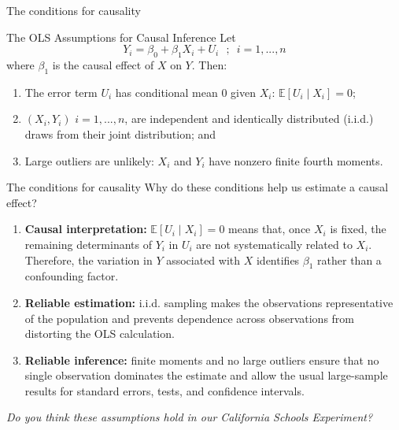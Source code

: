 \documentclass[notes,10pt, aspectratio=169]{beamer}
\begin{document}
\begin{frame}{The conditions for causality}
\begin{exampleblock}{The OLS Assumptions for Causal Inference}
Let
    \begin{equation*}
        Y_i  =  \beta_0 + \beta_1 X_i + U_i \text{~~;~~} i=1,...,n
    \end{equation*}
where $\beta_1$ is the causal effect of $X$ on $Y$. Then:
    \begin{enumerate}
        \item The error term $U_i$ has conditional mean $0$ given $X_i$: $\mathbb{E}[U_i\mid X_i]=0$;
        \item $(X_i, Y_i)$ $i=1,...,n$, are independent and identically distributed (i.i.d.) draws from their joint distribution; and
        \item Large outliers are unlikely: $X_i$ and $Y_i$ have nonzero finite fourth moments.
    \end{enumerate}
    
\end{exampleblock}
\end{frame}



\begin{frame}{The conditions for causality}
Why do these conditions help us estimate a causal effect?
\begin{enumerate}
    \item \textbf{Causal interpretation:} $\mathbb{E}[U_i\mid X_i]=0$ means that, once $X_i$ is fixed, the remaining determinants of $Y_i$ in $U_i$ are not systematically related to $X_i$. Therefore, the variation in $Y$ associated with $X$ identifies $\beta_1$ rather than a confounding factor.
    \item \textbf{Reliable estimation:} i.i.d. sampling makes the observations representative of the population and prevents dependence across observations from distorting the OLS calculation.
    \item \textbf{Reliable inference:} finite moments and no large outliers ensure that no single observation dominates the estimate and allow the usual large-sample results for standard errors, tests, and confidence intervals.
\end{enumerate}
\textit{Do you think these assumptions hold in our California Schools Experiment?}
\end{frame}
\end{document}
